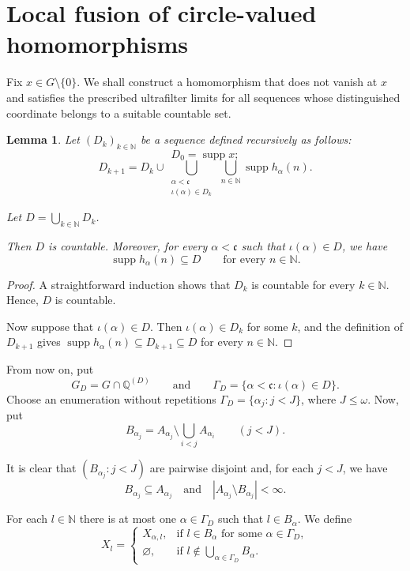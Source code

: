 \documentclass[11pt]{amsart}
\newtheorem{lemma}[theorem]{Lemma}
\theoremstyle{definition}
\newcommand{\N}{\mathbb N}
\newcommand{\Q}{\mathbb Q}
\newcommand{\cfrak}{\mathfrak c}
\newcommand{\supp}{\operatorname{supp}}
\begin{document}
\section{Local fusion of circle-valued homomorphisms}

Fix $x\in G\setminus\{0\}$.  We shall construct a homomorphism that
does not vanish at $x$ and satisfies the prescribed ultrafilter limits for
all sequences whose distinguished coordinate belongs to a suitable
countable set.

\begin{lemma}\label{lem:countable-dependency-closure}
Let $(D_k)_{k\in\N}$ be a sequence defined recursively as follows:
\[
D_0=\supp x;
\]
\[
D_{k+1}
=
D_k\cup
\bigcup_{\substack{\alpha<\cfrak\\ \iota(\alpha)\in D_k}}
\ \bigcup_{n\in\N}\supp h_\alpha(n).
\]

Let $D=\bigcup_{k\in\N}D_k$.

Then $D$ is countable. Moreover, for every $\alpha<\cfrak$ such that
$\iota(\alpha)\in D$, we have
\[
\supp h_\alpha(n)\subseteq D
\qquad\text{for every }n\in\N.
\]
\end{lemma}

\begin{proof}
A straightforward induction shows that $D_k$ is
countable for every $k\in\N$.  Hence, $D$ is countable.

Now suppose that $\iota(\alpha)\in D$.  Then $\iota(\alpha)\in D_k$ for
some $k$,
and the definition of $D_{k+1}$ gives
$\supp h_\alpha(n)\subseteq D_{k+1}\subseteq D$ for every $n\in\N$.
\end{proof}

From now on, put
\[
 G_D=G\cap\Q^{(D)} \qquad\text{and}\qquad
  \Gamma_D
 =
 \{\alpha<\cfrak:\iota(\alpha)\in D\}.
\]
Choose an enumeration without repetitions
$\Gamma_D=\{\alpha_j:j<J\}$, where $J\leq\omega$. Now, put
\[
 B_{\alpha_j}
 =
 A_{\alpha_j}\setminus\bigcup_{i<j}A_{\alpha_i}
 \qquad(j<J).
\]

It is clear that $(B_{\alpha_j}:j<J)$ are pairwise disjoint and, for each
$j<J$, we have
\begin{equation}\label{eq:local-block-properties}
 B_{\alpha_j}\subseteq A_{\alpha_j}
 \quad\text{and}\quad
 |A_{\alpha_j}\setminus B_{\alpha_j}|<\infty.
\end{equation}

For each $l\in\N$ there is at
most one $\alpha\in\Gamma_D$ such that $l\in B_\alpha$.  We define
\begin{equation}\label{eq:local-stage-set}
 X_l=
 \begin{cases}
  X_{\alpha,l},&\text{if $l\in B_\alpha$ for some $\alpha\in\Gamma_D$},\\
  \varnothing,&\text{if $l\notin\displaystyle\bigcup_{\alpha\in\Gamma_D}B_\alpha$}.
 \end{cases}
\end{equation}
\end{document}
